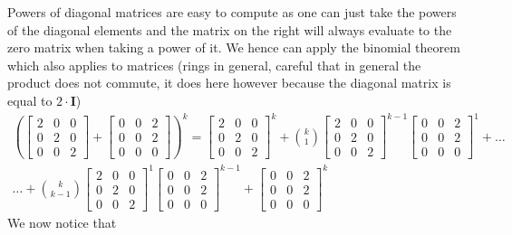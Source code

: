 \documentclass{article}
\begin{document}
Powers of diagonal matrices are easy to compute as one can just take the powers of the diagonal elements and the matrix on the right will always evaluate to the zero matrix when taking a power of it. We hence can apply the binomial theorem which also applies to matrices (rings in general, careful that in general the product does not commute, it does here however because the diagonal matrix is equal to $2\cdot \mathbf{I}$)
\begin{align*}
    \left(\begin{bmatrix}
    2 & 0 & 0 \\
    0 & 2 & 0 \\
    0 & 0 & 2
\end{bmatrix} + \begin{bmatrix}
    0 & 0 & 2 \\
    0 & 0 & 2 \\
    0 & 0 & 0
   \end{bmatrix}\right)^{k} = \begin{bmatrix}
    2 & 0 & 0 \\
    0 & 2 & 0 \\
    0 & 0 & 2
\end{bmatrix}^{k} + \binom{k}{1}\begin{bmatrix}
    2 & 0 & 0 \\
    0 & 2 & 0 \\
    0 & 0 & 2
\end{bmatrix}^{k-1} \begin{bmatrix}
    0 & 0 & 2 \\
    0 & 0 & 2 \\
    0 & 0 & 0
   \end{bmatrix}^{1} + \dots \\ \dots+ \binom{k}{k-1}\begin{bmatrix}
    2 & 0 & 0 \\
    0 & 2 & 0 \\
    0 & 0 & 2
\end{bmatrix}^{1} \begin{bmatrix}
    0 & 0 & 2 \\
    0 & 0 & 2 \\
    0 & 0 & 0
   \end{bmatrix}^{k-1} + \begin{bmatrix}
    0 & 0 & 2 \\
    0 & 0 & 2 \\
    0 & 0 & 0
   \end{bmatrix}^{k}
\end{align*}
We now notice that 
\end{document}
